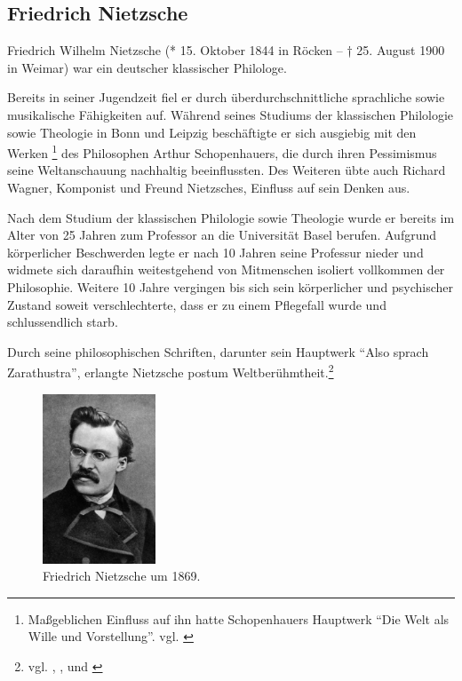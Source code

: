 \subsection{Friedrich Nietzsche}
Friedrich Wilhelm Nietzsche (* 15. Oktober 1844 in Röcken – † 25. August 1900 in Weimar) war ein deutscher klassischer Philologe.

Bereits in seiner Jugendzeit fiel er durch überdurchschnittliche sprachliche sowie musikalische Fähigkeiten auf.
Während seines Studiums der klassischen Philologie sowie Theologie in Bonn und Leipzig beschäftigte er sich ausgiebig mit den Werken
\footnote{Maßgeblichen Einfluss auf ihn hatte Schopenhauers Hauptwerk \enquote{Die Welt als Wille und Vorstellung}. vgl. \cite{Schopenhauer1}}
des Philosophen Arthur Schopenhauers, die durch ihren Pessimismus seine Weltanschauung nachhaltig beeinflussten.
Des Weiteren übte auch Richard Wagner, Komponist und Freund Nietzsches, Einfluss auf sein Denken aus.

Nach dem Studium der klassischen Philologie sowie Theologie wurde er bereits im Alter von 25 Jahren zum Professor an die Universität Basel berufen.
Aufgrund körperlicher Beschwerden legte er nach 10 Jahren seine Professur nieder und widmete sich daraufhin weitestgehend von Mitmenschen isoliert vollkommen der Philosophie.
Weitere 10 Jahre vergingen bis sich sein körperlicher und psychischer Zustand soweit verschlechterte, dass er zu einem Pflegefall wurde und schlussendlich starb.

Durch seine philosophischen Schriften, darunter sein Hauptwerk \enquote{Also sprach Zarathustra}, erlangte Nietzsche postum Weltberühmtheit.\footnote{vgl. \cite{Nietzsche1}, \cite{Nietzsche2}, \cite{Nietzsche3} und \cite{Nietzsche4}}

\begin{figure}[H]
\centering 
 \includegraphics[width=0.3\textwidth]{Bilder/kap3/nietzschePortrait} 
 \caption{Friedrich Nietzsche um 1869.\cite{WQ14}  \label{portraitNietzsche}}
\end{figure}

